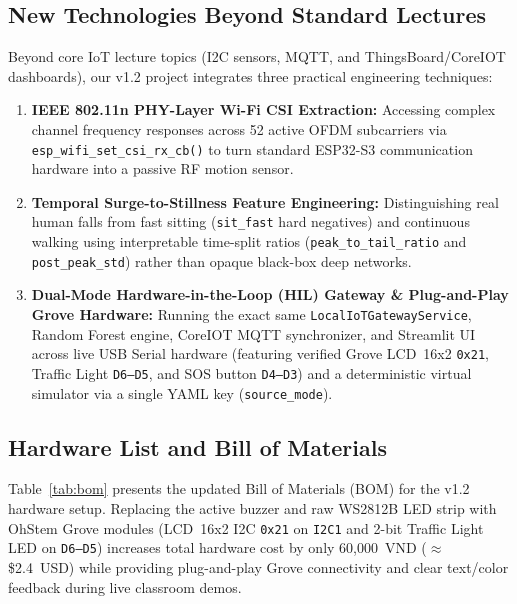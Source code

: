 \documentclass{hcmut-report}
\begin{document}
\subsection{New Technologies Beyond Standard Lectures}
Beyond core IoT lecture topics (I2C sensors, MQTT, and ThingsBoard/CoreIOT dashboards), our v1.2 project integrates three practical engineering techniques:
\begin{enumerate}
  \item \textbf{IEEE 802.11n PHY-Layer Wi-Fi CSI Extraction:} Accessing complex channel frequency responses across 52 active OFDM subcarriers via \texttt{esp\_wifi\_set\_csi\_rx\_cb()} to turn standard ESP32-S3 communication hardware into a passive RF motion sensor.
  \item \textbf{Temporal Surge-to-Stillness Feature Engineering:} Distinguishing real human falls from fast sitting (\texttt{sit\_fast} hard negatives) and continuous walking using interpretable time-split ratios (\texttt{peak\_to\_tail\_ratio} and \texttt{post\_peak\_std}) rather than opaque black-box deep networks.
  \item \textbf{Dual-Mode Hardware-in-the-Loop (HIL) Gateway \& Plug-and-Play Grove Hardware:} Running the exact same \texttt{LocalIoTGatewayService}, Random Forest engine, CoreIOT MQTT synchronizer, and Streamlit UI across live USB Serial hardware (featuring verified Grove LCD~16x2 \texttt{0x21}, Traffic Light \texttt{D6--D5}, and SOS button \texttt{D4--D3}) and a deterministic virtual simulator via a single YAML key (\texttt{source\_mode}).
\end{enumerate}

\subsection{Hardware List and Bill of Materials}
Table~\ref{tab:bom} presents the updated Bill of Materials (BOM) for the v1.2 hardware setup. Replacing the active buzzer and raw WS2812B LED strip with OhStem Grove modules (LCD~16x2 I2C \texttt{0x21} on \texttt{I2C1} and 2-bit Traffic Light LED on \texttt{D6--D5}) increases total hardware cost by only 60,000~VND ($\approx$ \$2.4~USD) while providing plug-and-play Grove connectivity and clear text/color feedback during live classroom demos.
\end{document}
